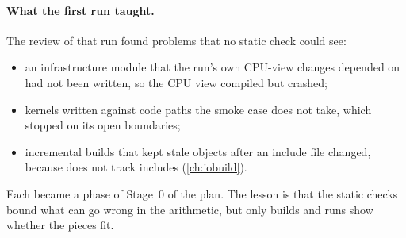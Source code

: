 \paragraph{What the first run taught.} The review of that run found problems that no static check could see:
\begin{itemize}
  \item an infrastructure module that the run's own CPU-view changes depended on had not been written, so the CPU view
    compiled but crashed;
  \item kernels written against code paths the smoke case does not take, which stopped on its open boundaries;
  \item incremental builds that kept stale objects after an include file changed, because  does not track
    includes (\cref{ch:iobuild}).
\end{itemize}
Each became a phase of Stage~0 of the plan. The lesson is that the static checks bound what can go wrong in the
arithmetic, but only builds and runs show whether the pieces fit.
